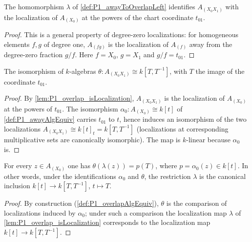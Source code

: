 \begin{lemma}
  \label{lem:P1_overlap_isLocalization}
  \leanok
  The homomorphism \(\lambda\) of \ref{def:P1_awayToOverlapLeft} identifies
  \(A_{(X_0 X_1)}\) with the localization of \(A_{(X_0)}\) at the powers of the chart
  coordinate \(t_{01}\).
\end{lemma}
\begin{proof}
  \leanok
  This is a general property of degree-zero localizations: for homogeneous elements \(f, g\)
  of degree one, \(A_{(fg)}\) is the localization of \(A_{(f)}\) away from the degree-zero
  fraction \(g/f\). Here \(f = X_0\), \(g = X_1\) and \(g/f = t_{01}\).
\end{proof}

\begin{definition}
  \label{def:P1_overlapAlgEquiv}
  \leanok
  The isomorphism of \(k\)-algebras \(\theta : A_{(X_0 X_1)} \cong k[T, T^{-1}]\), with
  \(T\) the image of the coordinate \(t_{01}\).
\end{definition}
\begin{proof}
  \leanok
  By \ref{lem:P1_overlap_isLocalization}, \(A_{(X_0X_1)}\) is the localization of
  \(A_{(X_0)}\) at the powers of \(t_{01}\). The isomorphism
  \(\alpha_0 : A_{(X_0)} \cong k[t]\) of \ref{def:P1_awayAlgEquiv} carries \(t_{01}\) to
  \(t\), hence induces an isomorphism of the two localizations
  \(A_{(X_0X_1)} \cong k[t]_{t} = k[T, T^{-1}]\) (localizations at corresponding
  multiplicative sets are canonically isomorphic). The map is \(k\)-linear because
  \(\alpha_0\) is.
\end{proof}

\begin{lemma}
  \label{lem:P1_overlap_res_left}
  \leanok
  For every \(z \in A_{(X_0)}\) one has \(\theta(\lambda(z)) = p(T)\), where
  \(p = \alpha_0(z) \in k[t]\). In other words, under the identifications
  \(\alpha_0\) and \(\theta\), the restriction \(\lambda\) is the canonical inclusion
  \(k[t] \to k[T, T^{-1}]\), \(t \mapsto T\).
\end{lemma}
\begin{proof}
  \leanok
  By construction (\ref{def:P1_overlapAlgEquiv}), \(\theta\) is the comparison of
  localizations induced by \(\alpha_0\); under such a comparison the localization map
  \(\lambda\) of \ref{lem:P1_overlap_isLocalization} corresponds to the localization map
  \(k[t] \to k[T, T^{-1}]\).
\end{proof}

